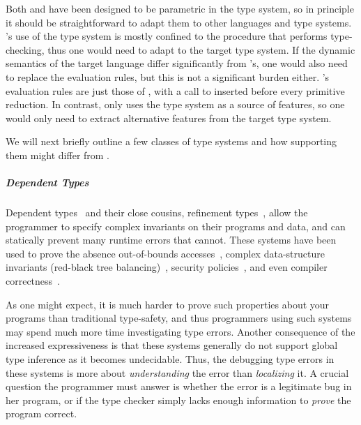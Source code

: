 Both  and  have been designed to be parametric
in the type system, so in principle it should be straightforward to
adapt them to other languages and type systems.
%
's use of the type system is mostly confined to the
\forcesym procedure that performs type-checking, thus one would need to
adapt \forcesym to the target type system. If the dynamic semantics of
the target language differ significantly from \ocaml's, one would also
need to replace the evaluation rules, but this is not a significant
burden either. 's evaluation rules are just those of
\ocaml, with a call to \forcesym inserted before every primitive
reduction.
%
In contrast,  only uses the type system as a source of
features, so one would only need to extract alternative features from
the target type system.

We will next briefly outline a few classes of type systems and how
supporting them might differ from \ocaml.

\subparagraph{Dependent Types}
%
Dependent types~\citep{Bertot2013-ao,Norell2007-cj,Brady2013-nl}
and their close cousins,
refinement types~\citep{Xi1998-we,Dunfield2007-ei,Rondon2008-ea,Swamy2011-rq},
%
allow the programmer to specify complex invariants on their programs and
data, and can statically prevent many runtime errors that \ocaml cannot.
%
These systems have been used to prove
%
the absence out-of-bounds accesses~\citep{Xi1998-we,Rondon2008-ea,Vazou2014-xk},
%
complex data-structure invariants (\eg red-black tree balancing)~\citep{Vazou2014-xk,Kawaguchi2009-cl},
%
security policies~\citep{Bengtson2011-ep,Swamy2011-rq},
%
and even compiler correctness~\citep{Leroy2009-zs}.

As one might expect, it is much harder to prove such properties about
your programs than traditional type-safety, and thus programmers using
such systems may spend much more time investigating type errors.
%
Another consequence of the increased expressiveness is that these
systems generally do not support global type inference as it becomes
undecidable.
%
Thus, the debugging type errors in these systems is more about
\emph{understanding} the error than \emph{localizing} it.
%
A crucial question the programmer must answer is whether the error is a
legitimate bug in her program, or if the type checker simply lacks
enough information to \emph{prove} the program correct.

